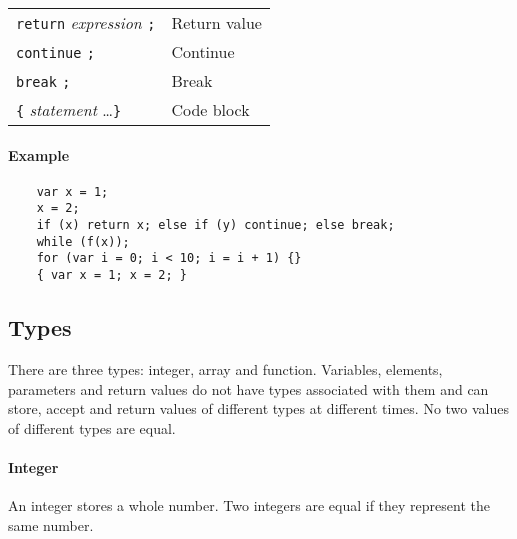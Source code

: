 \begin{table}[H]
\begin{tabular}{ m{225pt} l }
        \verb|return| \textit{expression} \verb|;|                                                                                                                                                                      & Return value         \\
        \verb|continue| \verb|;|                                                                                                                                                                                        & Continue             \\
        \verb|break| \verb|;|                                                                                                                                                                                           & Break                \\
        \verb|{| \textit{statement} \ldots \verb|}|                                                                                                                                                                     & Code block           \\
    \end{tabular}
\end{table}

\paragraph{Example}

\begin{verbatim}
    var x = 1;
    x = 2;
    if (x) return x; else if (y) continue; else break;
    while (f(x));
    for (var i = 0; i < 10; i = i + 1) {}
    { var x = 1; x = 2; }
\end{verbatim}

\subsection{Types}

There are three types: integer, array and function. Variables, elements, parameters and return values do not have types associated with them and can store, accept and return values of different types at different times. No two values of different types are equal.

\paragraph{Integer}

An integer stores a whole number. Two integers are equal if they represent the same number.

